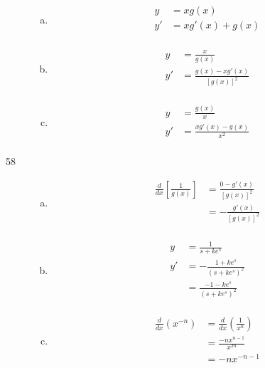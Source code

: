 \documentclass[letterpaper, landscape]{exam}
\begin{document}
\begin{description}
\begin{enumerate}[(a)]
        \item 
          \begin{align*}
            y  & = x g(x) \\
            y' & = \boxed{ x g'(x) + g(x) } \\
          \end{align*}

        \item 
          \begin{align*}
            y  & = \frac{x}{g(x)} \\
            y' & = \boxed{ \frac{g(x) - x g'(x)}{[g(x)]^2} } \\
          \end{align*}

        \item 
          \begin{align*}
            y  & = \frac{g(x)}{x} \\
            y' & = \boxed{ \frac{x g'(x) - g(x)}{x^2} } \\
          \end{align*}

      \end{enumerate}

    \item[58]
      \begin{enumerate}[(a)]
        \item 
          \begin{align*}
            \frac{d}{dx} \left[ \frac{1}{g(x)} \right] & = \frac{0 - g'(x)}{[g(x)]^2} \\
                                                       & = \boxed{ - \frac{g'(x)}{[g(x)]^2} } \\
          \end{align*}

        \item 
          \begin{align*}
            y  & = \frac{1}{s + k e^s} \\
            y' & = - \frac{1 + k e^s}{ \left( s + k e^s \right)^2} \\
               & = \boxed{ \frac{-1 - k e^s}{ \left( s + k e^s \right)^2} } \\
          \end{align*}

        \item
          \begin{align*}
            \frac{d}{dx} \left( x^{-n} \right) 
              & = \frac{d}{dx} \left( \frac{1}{x^n} \right) \\
              & = \frac{- n x^{n - 1}}{x^{2n}} \\
              & = - n x^{-n - 1} \\
          \end{align*}
      \end{enumerate}

   \end{description}
 
\end{document}
